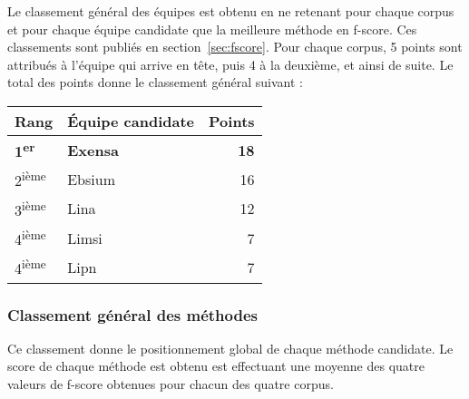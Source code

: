 \documentclass[10pt,twoside]{article}
\newcommand{\fscore}{f-score}
\begin{document}
Le classement général des équipes est obtenu en ne retenant pour chaque corpus et pour chaque équipe candidate que la meilleure méthode en \fscore. Ces classements sont publiés en section~\ref{sec:fscore}. Pour chaque corpus, 5 points sont attribués à l'équipe qui arrive en tête, puis 4 à la deuxième, et ainsi de suite. Le total des points donne le classement général suivant :

\begin{center}
\large
\begin{tabular}{l | l r}
Rang & Équipe candidate & Points \\
\hline
\hline
\textbf{1\textsuperscript{er}} & \textbf{Exensa} & \textbf{18} \\
2\textsuperscript{ième} & Ebsium & 16 \\
3\textsuperscript{ième} & Lina & 12 \\
4\textsuperscript{ième} & Limsi & 7 \\
4\textsuperscript{ième} & Lipn & 7 \\
\end{tabular}
\end{center}
    
\subsubsection{Classement général des méthodes}

Ce classement donne le positionnement global de chaque méthode candidate. Le score de chaque méthode est obtenu est effectuant une moyenne des quatre valeurs de \fscore{} obtenues pour chacun des quatre corpus.
\end{document}
